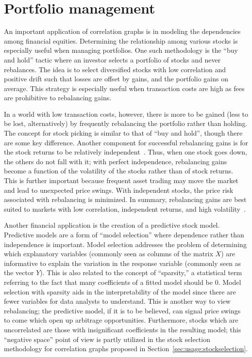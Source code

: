 \section{Portfolio management}
\label{sec:intro:finance}

An important application of correlation graphs is in modeling the dependencies among financial equities. Determining the relationship among various stocks is especially useful when managing portfolios. One such methodology is the ``buy and hold'' tactic where an investor selects a portfolio of stocks and never rebalances. The idea is to select diversified stocks with low correlation and positive drift such that losses are offset by gains, and the portfolio gains on average. This strategy is especially useful when transaction costs are high as fees are prohibitive to rebalancing gains. 

In a world with low transaction costs, however, there is more to be gained (less to be lost, alternatively) by frequently rebalancing the portfolio rather than holding. The concept for stock picking is similar to that of ``buy and hold'', though there are some key difference. Another component for successful rebalancing gains is for the stock returns to be relatively independent~\cite{liuh2016}. Thus, when one stock goes down, the others do not fall with it; with perfect independence, rebalancing gains become a function of the volatility of the stocks rather than of stock returns. This is further important because frequent asset trading may move the market and lead to unexpected price swings. With independent stocks, the price risk associated with rebalancing is minimized. In summary, rebalancing gains are best suited to markets with low correlation, independent returns, and high volatility~\cite{liuh2016}.  

Another financial application is the creation of a predictive stock model. Predictive models are a form of ``model selection'' where dependence rather than independence is important. Model selection addresses the problem of determining which explanatory variables (commonly seen as columns of the matrix $X$) are informative to explain the variation in the response variable (commonly seen as the vector $Y$). This is also related to the concept of ``sparsity,'' a statistical term referring to the fact that many coefficients of a fitted model should be 0. Model selection with sparsity aids in the interpretability of the model since there are fewer variables for data analysts to understand. This is another way to view rebalancing; the predictive model, if it is to be believed, can signal price swings to come which open up arbitrage opportunities. Furthermore, stocks which are uncorrelated are those with insignificant coefficients in the resulting model; this ``negative space'' point of view is partly utilized in the stock selection methodology for correlation graphs proposed in  Section~\ref{sec:usage:stockselection}.

